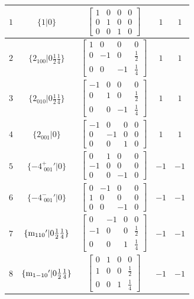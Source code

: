 \documentclass[fleqn,8pt]{jsarticle}
\begin{document}
\begin{longtable}{ccccc}
$ 1 $ & $ \{1|0\} $ & $ \begin{bmatrix} 1 & 0 & 0 & 0 \\ 0 & 1 & 0 & 0 \\ 0 & 0 & 1 & 0 \end{bmatrix} $ & $ 1 $ & $ 1 $ \\ \hline
$ 2 $ & $ \{2{}_{100}|0 \frac{1}{2} \frac{1}{4}\} $ & $ \begin{bmatrix} 1 & 0 & 0 & 0 \\ 0 & -1 & 0 & \frac{1}{2} \\ 0 & 0 & -1 & \frac{1}{4} \end{bmatrix} $ & $ 1 $ & $ 1 $ \\ \hline
$ 3 $ & $ \{2{}_{010}|0 \frac{1}{2} \frac{1}{4}\} $ & $ \begin{bmatrix} -1 & 0 & 0 & 0 \\ 0 & 1 & 0 & \frac{1}{2} \\ 0 & 0 & -1 & \frac{1}{4} \end{bmatrix} $ & $ 1 $ & $ 1 $ \\ \hline
$ 4 $ & $ \{2{}_{001}|0\} $ & $ \begin{bmatrix} -1 & 0 & 0 & 0 \\ 0 & -1 & 0 & 0 \\ 0 & 0 & 1 & 0 \end{bmatrix} $ & $ 1 $ & $ 1 $ \\ \hline
$ 5 $ & $ \{-4^{+}_{\,\,001}{}'|0\} $ & $ \begin{bmatrix} 0 & 1 & 0 & 0 \\ -1 & 0 & 0 & 0 \\ 0 & 0 & -1 & 0 \end{bmatrix} $ & $ -1 $ & $ -1 $ \\ \hline
$ 6 $ & $ \{-4^{-}_{\,\,001}{}'|0\} $ & $ \begin{bmatrix} 0 & -1 & 0 & 0 \\ 1 & 0 & 0 & 0 \\ 0 & 0 & -1 & 0 \end{bmatrix} $ & $ -1 $ & $ -1 $ \\ \hline
$ 7 $ & $ \{{\rm m}_{110}{}'|0 \frac{1}{2} \frac{1}{4}\} $ & $ \begin{bmatrix} 0 & -1 & 0 & 0 \\ -1 & 0 & 0 & \frac{1}{2} \\ 0 & 0 & 1 & \frac{1}{4} \end{bmatrix} $ & $ -1 $ & $ -1 $ \\ \hline
$ 8 $ & $ \{{\rm m}_{1-10}{}'|0 \frac{1}{2} \frac{1}{4}\} $ & $ \begin{bmatrix} 0 & 1 & 0 & 0 \\ 1 & 0 & 0 & \frac{1}{2} \\ 0 & 0 & 1 & \frac{1}{4} \end{bmatrix} $ & $ -1 $ & $ -1 $ \\ \hline

\end{longtable}
\end{document}
